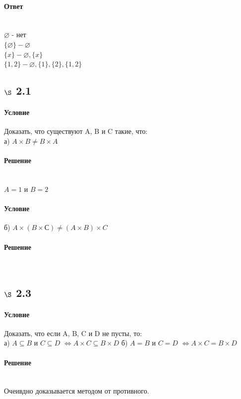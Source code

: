 \documentclass[a4paper,12pt]{article}
\begin{document}
\paragraph*{Ответ} \mbox{}\\
$\varnothing $ - нет\\
$\{ \varnothing \} - \varnothing$\\ 
$\{ x \} - \varnothing, \{x\}$\\
$\{1, 2\} - \varnothing, \{1\}, \{2\}, \{1, 2\}$

\subsection*{$\S$ 2.1}
\paragraph*{Условие}
Доказать, что существуют A, B и C такие, что:\\
а) $A \times B \neq B \times A$
\paragraph*{Решение} \mbox{}\\
$A = {1}$ и $B = {2}$ 
\paragraph*{Условие}
б) $A \times (B \times С) \neq (A \times B) \times C$
\paragraph*{Решение} \mbox{}\\

\subsection*{$\S$ 2.3}
\paragraph*{Условие}
Доказать, что если A, B, C и D не пусты, то:\\
а) $A \subseteq B$ и $ C \subseteq D $ $\Leftrightarrow A \times C \subseteq B \times D$
б) $A = B$ и $ C = D $ $\Leftrightarrow A \times C = B \times D$
\paragraph*{Решение} \mbox{}\\
Очеивдно доказывается методом от противного.
\end{document}
